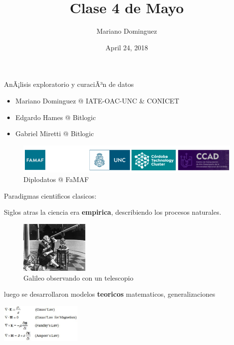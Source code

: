 \documentclass[ignorenonframetext,]{beamer}
\title{Clase 4 de Mayo}
\author{Mariano Dominguez}
\date{April 24, 2018}
\providecommand{\tightlist}{%
  \setlength{\itemsep}{0pt}\setlength{\parskip}{0pt}}
\begin{document}
\frame{\titlepage}

\begin{frame}{AnÃ¡lisis exploratorio y curaciÃ³n de datos}

\begin{itemize}
\tightlist
\item
  Mariano Dominguez @ IATE-OAC-UNC \& CONICET
\item
  Edgardo Hames @ Bitlogic
\item
  Gabriel Miretti @ Bitlogic
\end{itemize}

\begin{figure}
\centering
\includegraphics{./logos-diplomatura-3.png}
\caption{Diplodatos @ FaMAF}
\end{figure}

\end{frame}

\begin{frame}{Paradigmas cientificos clasicos:}

Siglos atras la ciencia era \textbf{empirica}, describiendo los procesos
naturales.

\begin{figure}
\centering
\includegraphics[width=0.30000\textwidth]{./13693233.jpg}
\caption{Galileo observando con un telescopio}
\end{figure}

luego se desarrollaron modelos \textbf{teoricos} matematicos,
generalizaciones

\end{frame}

\begin{frame}{\includegraphics[width=0.30000\textwidth]{./maxwellseq.jpg}}

\end{frame}
\end{document}
